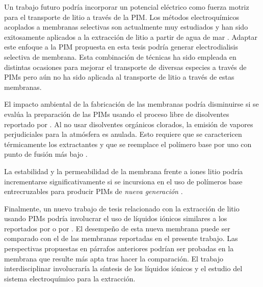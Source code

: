 Un trabajo futuro podría incorporar un potencial eléctrico como fuerza motriz para el transporte de litio a través de la \ac{PIM}. Los métodos electroquímicos acoplados a membranas selectivas son actualmente muy estudiados y han sido exitosamente aplicados a la extracción de litio a partir de agua de mar \citep{LIU2019}. Adaptar este enfoque a la PIM propuesta en esta tesis podría generar electrodialisis selectiva de membrana. Esta combinación de técnicas ha sido empleada en distintas ocasiones para mejorar el transporte de diversas especies a través de PIMs \citep{Kaya2016, See2013} pero aún no ha sido aplicada al transporte de litio a través de estas membranas.

El impacto ambiental de la fabricación de las membranas podría disminuirse si se evalúa la preparación de las PIMs usando el proceso libre de disolventes reportado por \citet{Vera2019}. Al no usar disolventes orgánicos clorados, la emisión de vapores perjudiciales para la atmósfera es anulada. Esto requiere que se caractericen térmicamente los extractantes y que se reemplace el polímero base por uno con punto de fusión más bajo \citet{Vera2019}.

La estabilidad y la permeabilidad de la membrana frente a iones litio podría incrementarse significativamente si se incursiona en el uso de polímeros base entrecruzables para producir PIMs de \textit{nueva generación} \citep{OBRYAN2017}.

Finalmente, un nuevo trabajo de tesis relacionado con la extracción de litio usando PIMs podría involucrar el uso de líquidos iónicos similares a los reportados por \citet{ZANTE2019} o por \citet{Shi2020}. El desempeño de esta nueva membrana puede ser comparado con el de las membranas reportadas en el presente trabajo. Las perspectivas propuestas en párrafos anteriores podrían ser probadas en la membrana que resulte más apta tras hacer la comparación. El trabajo interdisciplinar involucraría la síntesis de los líquidos iónicos y el estudio del sistema electroquímico para la extracción.

